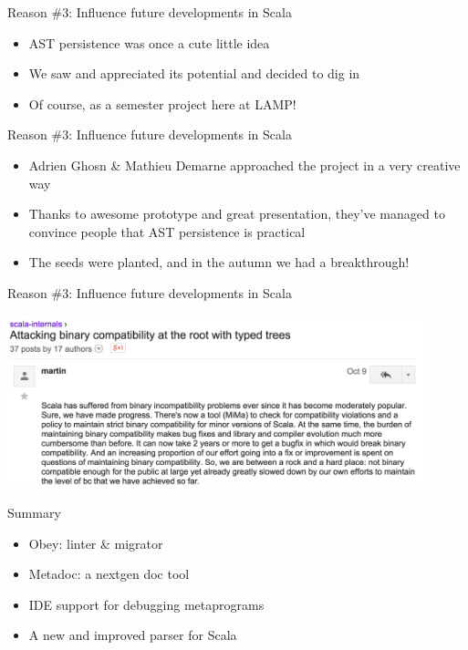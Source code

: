 \documentclass[svgnames,dvipsnames,hyperref={bookmarks=false},usepdftitle=false]{beamer}
\begin{document}
\begin{frame}{Reason \#3: Influence future developments in Scala}
\begin{itemize}
\item AST persistence was once a cute little idea
\item We saw and appreciated its potential and decided to dig in
\item Of course, as a semester project here at LAMP!
\end{itemize}
\end{frame}

\begin{frame}{Reason \#3: Influence future developments in Scala}
\begin{itemize}
\item Adrien Ghosn \& Mathieu Demarne approached the project in a very creative way
\item \alert{Thanks to awesome prototype and great presentation, they've managed to convince people that AST persistence is practical}
\item The seeds were planted, and in the autumn we had a breakthrough!
\end{itemize}
\end{frame}

\begin{frame}[c, fragile]{Reason \#3: Influence future developments in Scala}
\begin{center}
\includegraphics[height=5cm]{martin.png}
\end{center}
\end{frame}


\begin{frame}{Summary}
\begin{itemize}
\item Obey: linter \& migrator
\item Metadoc: a nextgen doc tool
\item IDE support for debugging metaprograms
\item A new and improved parser for Scala
\end{itemize}
\end{frame}
\end{document}
